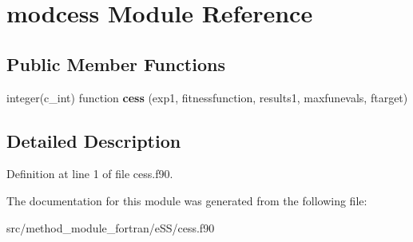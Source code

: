 \hypertarget{classmodcess}{\section{modcess Module Reference}
\label{classmodcess}
}
\subsection*{Public Member Functions}
\begin{DoxyCompactItemize}
\item 
\hypertarget{classmodcess_adff9acbd67deae42a7d01ff4164d45cb}{integer(c\-\_\-int) function {\bfseries cess} (exp1, fitnessfunction, results1, maxfunevals, ftarget)}\label{classmodcess_adff9acbd67deae42a7d01ff4164d45cb}

\end{DoxyCompactItemize}


\subsection{Detailed Description}


Definition at line 1 of file cess.\-f90.



The documentation for this module was generated from the following file\-:\begin{DoxyCompactItemize}
\item 
src/method\-\_\-module\-\_\-fortran/e\-S\-S/cess.\-f90\end{DoxyCompactItemize}

